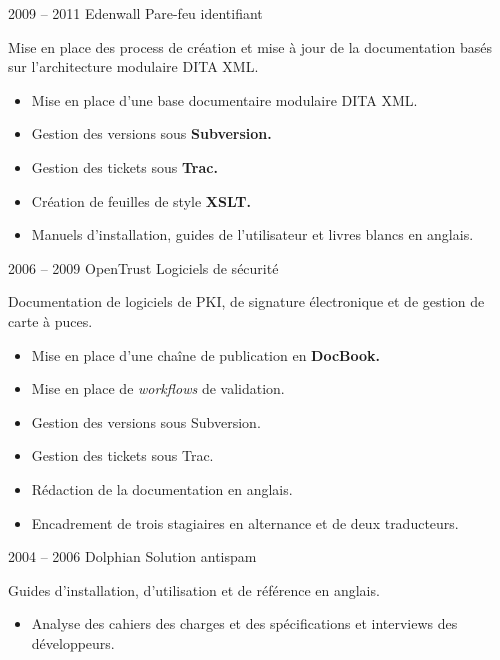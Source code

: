 \documentclass[12pt,a4paper,roman]{moderncv}
\begin{document}
\cventry
    {2009 – 2011}
    {Edenwall}
    {Pare-feu identifiant}
    {}
    {}
    {Mise en place des process de création et mise à jour de la documentation
      basés sur l'architecture modulaire DITA XML.
      \begin{itemize}
      \item Mise en place d'une base documentaire modulaire DITA XML.
      \item Gestion des versions sous \textbf{Subversion.}
      \item Gestion des tickets sous \textbf{Trac.}
      \item Création de feuilles de style \textbf{XSLT.}
      \item Manuels d'installation, guides de l'utilisateur et livres blancs en
        anglais.
    \end{itemize}}


\cventry
    {2006 – 2009}
    {OpenTrust}
    {Logiciels de sécurité}
    {}
    {}
    {Documentation de logiciels de PKI, de signature électronique et
      de gestion de carte à puces.
      \begin{itemize}
      \item Mise en place d'une chaîne de publication en \textbf{DocBook.}
      \item Mise en place de \emph{workflows} de validation.
      \item Gestion des versions sous Subversion.
      \item Gestion des tickets sous Trac.
      \item Rédaction de la documentation en anglais.
      \item Encadrement de trois stagiaires en alternance et de deux
        traducteurs.
    \end{itemize}}


\cventry
    {2004 – 2006}
    {Dolphian}
    {Solution antispam}
    {}
    {}
    {Guides d'installation, d'utilisation et de référence en anglais.
      \begin{itemize}
      \item Analyse des cahiers des charges et des spécifications et interviews
        des développeurs.
    \end{itemize}}

\end{document}
